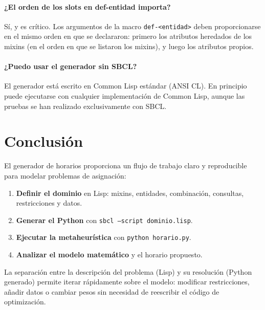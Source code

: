 \documentclass[12pt,a4paper]{article}
\newcommand{\code}[1]{\texttt{#1}}
\begin{document}
\paragraph{¿El orden de los slots en def-entidad importa?}
Sí, y es crítico. Los argumentos de la macro \code{def-<entidad>} deben
proporcionarse en el mismo orden en que se declararon: primero los
atributos heredados de los mixins (en el orden en que se listaron los
mixins), y luego los atributos propios.

\paragraph{¿Puedo usar el generador sin SBCL?}
El generador está escrito en Common Lisp estándar (ANSI CL). En principio
puede ejecutarse con cualquier implementación de Common Lisp, aunque las
pruebas se han realizado exclusivamente con SBCL.

\section*{Conclusión}

El generador de horarios proporciona un flujo de trabajo claro y
reproducible para modelar problemas de asignación:

\begin{enumerate}
  \item \textbf{Definir el dominio} en Lisp: mixins, entidades, combinación,
    consultas, restricciones y datos.
  \item \textbf{Generar el Python} con \code{sbcl --script dominio.lisp}.
  \item \textbf{Ejecutar la metaheurística} con \code{python horario.py}.
  \item \textbf{Analizar el modelo matemático} y el horario propuesto.
\end{enumerate}

La separación entre la descripción del problema (Lisp) y su resolución
(Python generado) permite iterar rápidamente sobre el modelo: modificar
restricciones, añadir datos o cambiar pesos sin necesidad de reescribir
el código de optimización.
\end{document}
